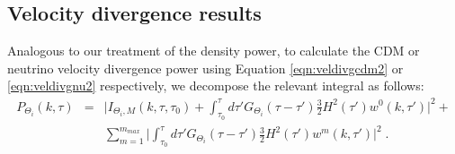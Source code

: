 \documentclass{aastex}
\begin{document}
\subsection{ Velocity divergence results }

Analogous to our treatment of the density power, to calculate
the CDM or neutrino velocity divergence power using
Equation \eqref{eqn:veldivgcdm2} or 
\eqref{eqn:veldivgnu2} 
respectively, we decompose the relevant integral as follows:
\begin{equation}\label{eqn:veldecomp}
\begin{array}{rcl}
  P_{\Theta_i}( k, \tau) &=& \bigg| I_{\Theta_i,M}(k, \tau, \tau_0) +
  \int_{\tau_0}^\tau d\tau' G_{\Theta_i}(\tau-\tau') \frac{3}{2} H^2(\tau')
  w^0(k,\tau') \bigg|^2 +\\[1em]
&& \sum_{m=1}^{m_{max}} \bigg| \int_{\tau_0}^\tau d \tau'
  G_{\Theta_i}(\tau-\tau') \frac{3}{2} H^2(\tau') w^m(k,\tau')
   \bigg|^2 \;.
\end{array}
\end{equation}


\end{document}
